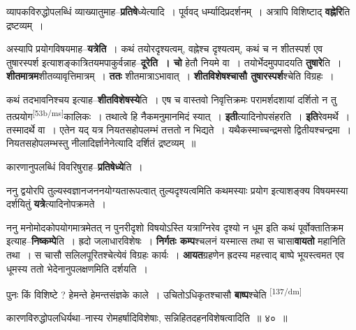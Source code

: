 \documentclass[article,12pt,a4paper]{memoir}
\begin{document}
	  \pstart व्यापकविरुद्धोपलब्धिं व्याख्यातुमाह--\textbf{प्रतिषे}ध्येत्यादि । पूर्ववद् धर्म्यादिप्रदर्शनम् । अत्रापि विशिष्टाद् \textbf{वह्नेरि}ति द्रष्टव्यम् ।
	\pend
      

	  \pstart अस्यापि प्रयोगविषयमाह--\textbf{यत्रेति} । कथं तयोरदृश्यत्वम्, वह्नेश्च दृश्यत्वम्, कथं च न शीतस्पर्श एव तुषारस्पर्श इत्याशङ्कात्रितयमपाकुर्वन्नाह--\textbf{दूरेति । चो} हेतौ नियमे वा । तयोर्भेदमुपपादयति \textbf{तुषारे}ति । \textbf{शीतमात्रम}शीतव्यावृत्तिमात्रम् । \textbf{ततः} शीतमात्राऽभावात् । \textbf{शीतविशेषश्चासौ तुषारस्पर्श}श्चेति विग्रहः ।
	\pend
      

	  \pstart कथं तदभावनिश्चय इत्याह--\textbf{शीतविशेषस्ये}ति । एष च वास्तवो निवृत्तिक्रमः परामर्शदशायां दर्शितो न तु तत्प्रयोग\leavevmode\textsuperscript{\rmlatinfont\tiny [53b/ms]}कालिकः । तथात्वे हि नैकमनुमानमिदं स्यात् । \textbf{इती}त्यादिनोपसंहरति । \textbf{इति}रेवमर्थे । तस्मादर्थे वा । एतेन यद् यत्र नियतसहोपलम्भं तत्ततो न भिद्यते । यथैकस्माच्चन्द्रमसो द्वितीयश्चन्द्रमा । नियतसहोपलम्भस्तु नीलादिर्ज्ञानेनेत्यादि दर्शितं द्रष्टव्यम् ॥
	\pend
      

	  \pstart कारणानुपलब्धिं विवरिषुराह--\textbf{प्रतिषेध्ये}ति ।
	\pend
      

	  \pstart ननु द्वयोरपि तुल्यस्वज्ञानजननयोग्यतारूपत्वात् तुल्यदृश्यत्वमिति कथमस्याः प्रयोग इत्याशङ्क्य विषयमस्या दर्शयितुं \textbf{यत्रे}त्यादिनोपक्रमते ।
	\pend
      

	  \pstart ननु मनोमोदकोपयोगमात्रमेतत् न पुनरीदृशो विषयोऽस्ति यत्राग्निरेव दृश्यो न धूम इति कथं पूर्वोक्तातिक्रम इत्याह--\textbf{निष्कम्पे}ति । ह्रदो जलाधारविशेषः । \textbf{निर्गतः कम्प}श्चलनं यस्मात्स तथा स चासा\textbf{वायतो} महानिति तथा । स चासौ सलिलपूरितश्चेत्येवं विग्रहः कार्यः । \textbf{आयत}ग्रहणेन ह्रदस्य महत्त्वाद् बाष्पे भूयस्त्वमत एव धूमस्य ततो भेदेनानुपलक्षणमिति दर्शयति ।
	\pend
      

	  \pstart पुनः किं विशिष्टे ? हेमन्ते हेमन्तसंज्ञके काले । उचितोऽधिकृतश्चासौ \textbf{बाष्प}श्चेति  \leavevmode\textsuperscript{\rmlatinfont\tiny [137/dm]} 
	  
	कारणविरुद्धोपलधिर्यथा--नास्य रोमहर्षादिविशेषाः, सन्निहितदहनविशेषत्वादिति ॥ ४० ॥ 
	  
\end{document}
